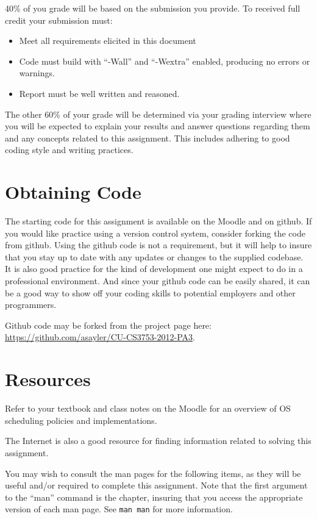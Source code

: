\documentclass[12pt]{article}
\begin{document}
40\% of you grade will be based on the submission you provide.
To received full credit your submission must:
\begin{itemize}
\item Meet all requirements elicited in this document
\item Code must build with ``-Wall'' and ``-Wextra'' enabled,
  producing no errors or warnings.
\item Report must be well written and reasoned.
\end{itemize}

The other 60\% of your grade will be determined via your grading
interview where you will be expected to explain your results and answer
questions regarding them and any concepts related to this assignment.
This includes adhering to good coding style and writing practices.

\section{Obtaining Code}
The starting code for this assignment is available on the Moodle and
on github. If you would like practice using a version control system,
consider forking the code from github. Using the github code is not
a requirement, but it will help to insure that you stay up to date
with any updates or changes to the supplied codebase. It is also
good practice for the kind of development one might expect to do in
a professional environment. And since your github code can be easily
shared, it can be a good way to show off your coding skills to
potential employers and other programmers.

Github code may be forked from the project page here:\\
\url{https://github.com/asayler/CU-CS3753-2012-PA3}.

\section{Resources}
Refer to your textbook and class notes on the Moodle for an overview
of OS scheduling policies and implementations.

The Internet\cite{tubes} is also a good resource for finding
information related to solving this assignment.

You may wish to consult the man pages for the following items, as they
will be useful and/or required to complete this assignment. Note that
the first argument to the ``man'' command is the chapter, insuring
that you access the appropriate version of each man page. See
\texttt{man man} for more information.
\end{document}
